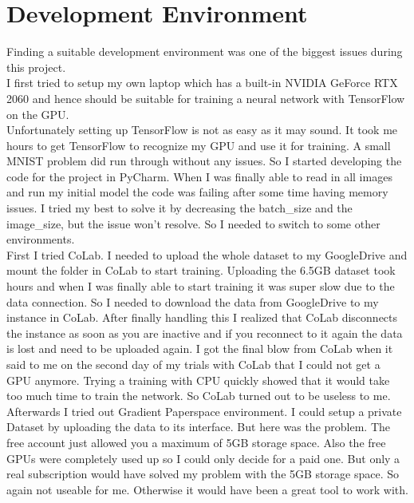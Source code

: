 \documentclass[]{article}
\begin{document}
\section{Development Environment}
Finding a suitable development environment was one of the biggest issues during this project.\\
I first tried to setup my own laptop which has a built-in NVIDIA GeForce RTX 2060 and hence should be suitable for training a neural network with TensorFlow on the GPU.\\
Unfortunately setting up TensorFlow is not as easy as it may sound. It took me hours to get TensorFlow to recognize my GPU and use it for training. A small MNIST problem did run through without any issues. So I started developing the code for the project in PyCharm. When I was finally able to read in all images and run my initial model the code was failing after some time having memory issues. I tried my best to solve it by decreasing the batch\_size and the image\_size, but the issue won't resolve. So I needed to switch to some other environments.\\
First I tried CoLab. I needed to upload the whole dataset to my GoogleDrive and mount the folder in CoLab to start training. Uploading the 6.5GB dataset took hours and when I was finally able to start training it was super slow due to the data connection. So I needed to download the data from GoogleDrive to my instance in CoLab. After finally handling this I realized that CoLab disconnects the instance as soon as you are inactive and if you reconnect to it again the data is lost and need to be uploaded again. I got the final blow from CoLab when it said to me on the second day of my trials with CoLab that I could not get a GPU anymore. Trying a training with CPU quickly showed that it would take too much time to train the network. So CoLab turned out to be useless to me.\\
Afterwards I tried out Gradient Paperspace environment. I could setup a private Dataset by uploading the data to its interface. But here was the problem. The free account just allowed you a maximum of 5GB storage space. Also the free GPUs were completely used up so I could only decide for a paid one. But only a real subscription would have solved my problem with the 5GB storage space. So again not useable for me. Otherwise it would have been a great tool to work with.\\
\end{document}
